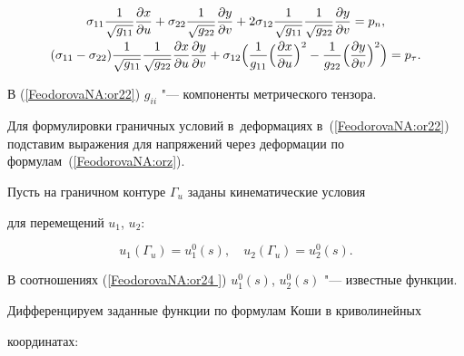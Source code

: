 \begin{equation}

\label{FeodorovaNA:or22} 

\begin{array}{c}

\displaystyle \sigma_{11}\frac{1}{\sqrt{g_{11}}}\frac{\partial

x}{\partial u}+\sigma_{22}\frac{1}{\sqrt{g_{22}}}\frac{\partial

y}{\partial

v}+2\sigma_{12}\frac{1}{\sqrt{g_{11}}}\frac{1}{\sqrt{g_{22}}}\frac{\partial

y}{\partial v}=p_{n}, \vspace{1mm}\\

\displaystyle

(\sigma_{11}-\sigma_{22})\frac{1}{\sqrt{g_{11}}}\frac{1}{\sqrt{g_{22}}}\frac{\partial

x}{\partial u}\frac{\partial y}{\partial

v}+\sigma_{12}\Bigl(\frac{1}{g_{11}}\Bigl(\frac{\partial x}{\partial u}\Bigr)^2-\frac{1}{g_{22}}\Bigl(\frac{\partial y}{\partial v}\Bigr)^2\Bigr)=p_{\tau}.

\end{array}

\end{equation}

В (\ref{FeodorovaNA:or22}) $g_{ii}$ "--- компоненты метрического тензора. 

Для формулировки граничных условий в~деформациях в~(\ref{FeodorovaNA:or22}) подставим выражения для напряжений через деформации по формулам~(\ref{FeodorovaNA:orz}).



Пусть на граничном контуре $\Gamma_u$ заданы кинематические условия

для перемещений $u_1$, $u_2$:

\begin{equation}

\label{FeodorovaNA:or24 } u_1(\Gamma_u)=u_1^0(s),\quad u_2(\Gamma_u)=u_2^0(s).

\end{equation}

В соотношениях (\ref{FeodorovaNA:or24 })  $ u_1^0(s)$, $u_2^0(s)$ "--- известные функции. 

Дифференцируем заданные функции по формулам Коши в криволинейных

 координатах:

